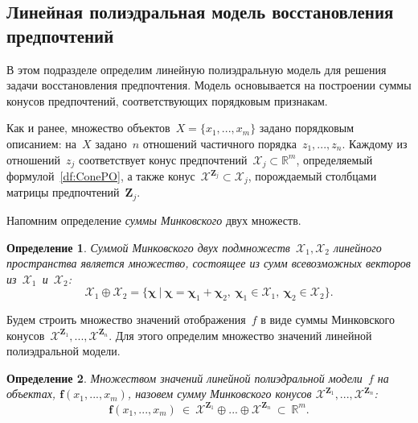 \documentclass{elsarticle}
\newcommand{\bfx}{\mathbf{f}}
\newcommand{\bZ}{\mathbf{Z}}
\newcommand{\bchi}{\boldsymbol{\chi}}
\newcommand{\blambda}{\boldsymbol{\lambda}}
\newcommand{\cX}{\mathcal{X}}
\newcommand{\cY}{\mathcal{Y}}
\newtheorem{df}{Определение}
\begin{document}

\subsection{Линейная полиэдральная модель восстановления предпочтений}\label{subsec:LinPolyhedMdl}
В этом подразделе определим линейную полиэдральную модель для решения задачи восстановления предпочтения. Модель основывается на построении суммы конусов предпочтений, соответствующих порядковым признакам.

Как и ранее, множество объектов~$X=\{x_1,...,x_m\}$ задано порядковым описанием: на~$X$ задано~$n$ отношений частичного порядка~$z_1,...,z_n$. Каждому из отношений~$z_j$ соответствует конус предпочтений~$\cX_j\subset \mathbb{R}^m$, определяемый формулой~\eqref{df:ConePO}, а также конус~$\cX^{\bZ_j}\subset \cX_j$, порождаемый столбцами матрицы предпочтений~$\bZ_j$.

 Напомним определение \emph{суммы Минковского} двух множеств.
\begin{df}
Суммой Минковского двух подмножеств~$\cX_1,\cX_2$ линейного пространства является множество, состоящее из сумм всевозможных векторов из~$\cX_1$~и~$\cX_2$:
\[
\cX_1\oplus \cX_2 =\{\bchi~|~\bchi=\bchi_1+\bchi_2,~\bchi_1\in \cX_1,~\bchi_2\in \cX_2\}.
\]
\end{df}

Будем строить множество значений отображения~$f$ в виде суммы Минковского конусов~$\cX^{\bZ_1},...,\cX^{\bZ_n}$. Для этого определим множество значений линейной полиэдральной модели.
\begin{df}
Множеством значений линейной полиэдральной модели~$f$ на объектах, $\bfx(x_1,...,x_m)$, назовем сумму Минковского конусов $\cX^{\bZ_1},...,\cX^{\bZ_n}$:
\begin{equation}
\bfx(x_1,...,x_m)~\in~\cX^{\bZ_1}\oplus ... \oplus \cX^{\bZ_n}~\subset~\mathbb{R}^m.
\label{df:LinPolyhedSet}
\end{equation}
\end{df}
\end{document}
